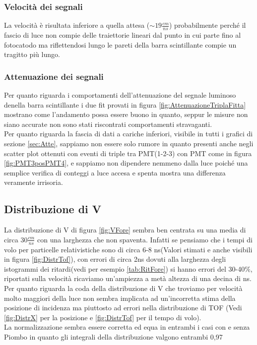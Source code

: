 \documentclass[a4paper]{article}
\begin{document}
\subsubsection{Velocità dei segnali}
La velocità è risultata inferiore a quella attesa ($\sim 19\frac{cm}{ns}$) probabilmente perché il fascio di luce non compie delle traiettorie lineari dal punto in cui parte fino al fotocatodo ma riflettendosi lungo le pareti della barra scintillante compie un tragitto più lungo.

\subsubsection{Attenuazione dei segnali}
Per quanto riguarda i comportamenti dell'attenuazione del segnale luminoso denella barra scintillante i due fit provati in figura \ref{fig:AttenuazioneTriplaFitta} mostrano come l'andamento possa essere buono in quanto, seppur le misure non siano accurate non sono
stati riscontrati comportamenti stravaganti.\\
Per quanto riguarda la fascia di dati a cariche inferiori, visibile in tutti i grafici di sezione \ref{sec:Atte}, sappiamo non essere solo rumore in quanto presenti anche negli scatter plot ottenuti con eventi di triple tra PMT(1-2-3) con PMT come in figura \ref{fig:PMT3posPMT4}, e sappiamo non dipendere nemmeno dalla luce poiché una semplice verifica di conteggi a luce accesa e spenta mostra una differenza veramente irrisoria.


\subsection{Distribuzione di V}
La distribuzione di V di figura \ref{fig:VFore} sembra ben centrata su una media di circa 30$\frac{cm}{ns}$ con una larghezza che non spaventa. Infatti se pensiamo che i tempi di volo per particelle relativistiche sono di circa 6-8 ns(Valori stimati e anche visibili in figura \ref{fig:DistrTof}), con errori di circa 2ns dovuti alla larghezza degli istogrammi dei ritardi(vedi per esempio \ref{tab:RitFore}) si hanno errori del 30-40$\%$, riportati sulla velocità ricaviamo un'ampiezza a metà altezza di una decina di ns. Per quanto riguarda la coda della distribuzione di V che troviamo per velocità molto maggiori della luce non sembra implicata ad un'incorretta stima della posizione di incidenza ma piuttosto ad errori nella distribuzione di TOF (Vedi \ref{fig:DistrX} per la posizione e \ref{fig:DistrTof} per il tempo di volo).\\
La normalizzazione sembra essere corretta ed equa in entrambi i casi con e senza Piombo in quanto gli integrali della distribuzione valgono entrambi 0,97
\end{document}
